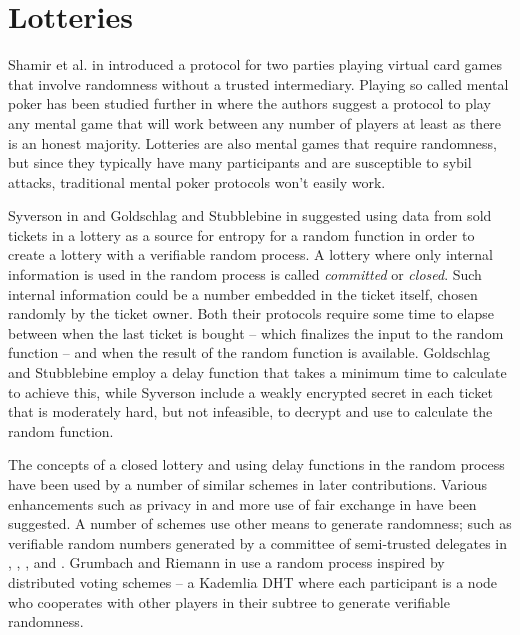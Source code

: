 \section{Lotteries}
\label{sec:lotteries}

Shamir et al. in \cite{shamir_mental_1981} introduced a protocol for two parties playing virtual card games that involve randomness without a trusted intermediary. Playing so called mental poker has been studied further in \cite{goldreich_how_1987} where the authors suggest a protocol to play any mental game that will work between any number of players at least as there is an honest majority. Lotteries are also mental games that require randomness, but since they typically have many participants and are susceptible to sybil attacks, traditional mental poker protocols won't easily work.

Syverson in \cite{syverson_weakly_1998} and Goldschlag and Stubblebine in \cite{goldschlag_publicly_1998} suggested using data from sold tickets in a lottery as a source for entropy for a random function in order to create a lottery with a verifiable random process. A lottery where only internal information is used in the random process is called \emph{committed} or \emph{closed}. Such internal information could be a number embedded in the ticket itself, chosen randomly by the ticket owner. Both their protocols require some time to elapse between when the last ticket is bought – which finalizes the input to the random function – and when the result of the random function is available. Goldschlag and Stubblebine employ a delay function that takes a minimum time to calculate to achieve this, while Syverson include a weakly encrypted secret in each ticket that is moderately hard, but not infeasible, to decrypt and use to calculate the random function.

The concepts of a closed lottery and using delay functions in the random process have been used by a number of similar schemes in later contributions. Various enhancements such as privacy in \cite{zhou_playing_2001} and more use of fair exchange in \cite{chow_e-lottery_2005} have been suggested. A number of schemes use other means to generate randomness; such as verifiable random numbers generated by a committee of semi-trusted delegates in \cite{fouque_sharing_2001}, \cite{lee_design_2009}, \cite{liu_improved_2014}, and \cite{xia_information_2019}. Grumbach and Riemann in \cite{grumbach_distributed_2017} use a random process inspired by distributed voting schemes – a Kademlia DHT where each participant is a node who cooperates with other players in their subtree to generate verifiable randomness. 

